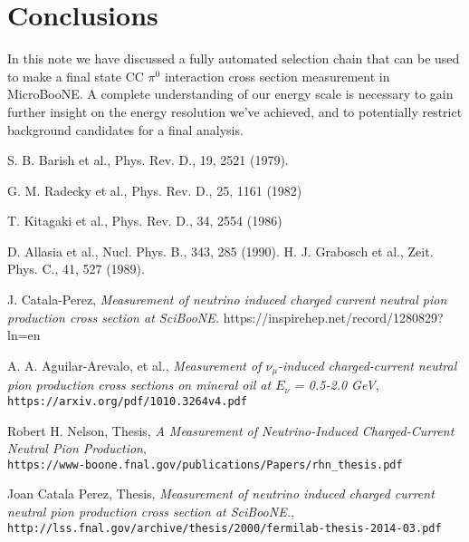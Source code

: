 \documentclass[a4paper]{article}
\begin{document}
\section{Conclusions}
\label{sec:conclusions}
\par In this note we have discussed a fully automated selection chain that can be used to make a final state CC $\pi^0$ interaction cross section measurement in MicroBooNE.  A complete understanding of our energy scale is necessary to gain further insight on the energy resolution we've achieved, and to potentially restrict background candidates for a final analysis.  

\newpage

\begin{thebibliography}{9}


  S. B. Barish et al., Phys. Rev. D., 19, 2521 (1979).

 G. M. Radecky et al., Phys. Rev. D., 25, 1161 (1982)
 
 T. Kitagaki et al., Phys. Rev. D., 34, 2554 (1986)
 
 D. Allasia et al., Nucl. Phys. B., 343, 285 (1990).
 H. J. Grabosch et al., Zeit. Phys. C., 41, 527 (1989).

J. Catala-Perez, \emph{Measurement of neutrino induced charged current neutral pion production cross section at SciBooNE.}
https://inspirehep.net/record/1280829?ln=en

  A. A. Aguilar-Arevalo, et al., \emph{Measurement of $\nu_\mu$-induced charged-current neutral pion production cross sections on mineral oil at $E_\nu$ = 0.5-2.0 GeV},\\
  \texttt{https://arxiv.org/pdf/1010.3264v4.pdf}

  Robert H. Nelson, Thesis, \emph{A Measurement of Neutrino-Induced Charged-Current Neutral Pion Production},\\
  \texttt{https://www-boone.fnal.gov/publications/Papers/rhn\_thesis.pdf}
  
  Joan Catala Perez, Thesis, \emph{Measurement of neutrino induced charged current neutral pion production cross section at SciBooNE.},\\
  \texttt{http://lss.fnal.gov/archive/thesis/2000/fermilab-thesis-2014-03.pdf}  


\end{thebibliography}
\end{document}

